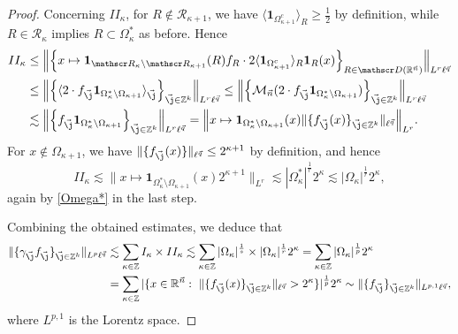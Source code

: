 \documentclass[10pt,a4paper]{amsart}
\newcommand{\Avee}[2]{\langle#1\rangle_{#2}}
\newcommand{\BNorm}[2]{\Big\|#1\Big\|_{#2}}
\newcommand{\Norm}[2]{\|#1\|_{#2}}
\newcommand{\Rs}{\mathscr R}
\newcommand{\R}{\mathbb R}
\newcommand{\Z}{\mathbb Z}
\newcommand{\abs}[1]{|#1|}
\newcommand{\ave}[1]{\langle #1\rangle}
\newcommand{\one}{\mathbf{1}}
\newcommand{\vj}{\vec{\textit{\j}}}
\newcommand{\vn}{\vec n}
\newcommand{\vq}{\vec q}
\begin{document}
\begin{proof}
Concerning $II_\kappa$, for $R\notin\Rs_{\kappa+1}$,
we have $\ave{\one_{\Omega_{\kappa+1}^c}}_R\geq\frac12$ by definition,
while $R\in\Rs_{\kappa}$ implies $R\subset\Omega_{\kappa}^*$ as before. Hence
\begin{align*}
II_\kappa
&\leq\BNorm{\Big\{x\mapsto \one_{\Rs_\kappa\setminus\Rs_{\kappa+1}}(R)f_{R}\cdot 2\ave{\one_{\Omega_{\kappa+1}^c}}_R\one_R(x)\Big\}_{R\in\mathscr D(\mathbb R^{\vn})}}{L^r\ell^{\vq}}  \\
&\leq \BNorm{\Big\{\Avee{2\cdot f_{\vj}\one_{\Omega_\kappa^*\setminus\Omega_{\kappa+1}}}{\vj}\Big\}_{\vj\in\mathbb Z^k}}{L^r\ell^{\vq}}
\leq \BNorm{\Big\{\mathcal M_{\vn}(2\cdot f_{\vj}\one_{\Omega_\kappa^*\setminus\Omega_{\kappa+1}}) \Big\}_{\vj\in\mathbb Z^k}}{L^r\ell^{\vq}} \\
&\lesssim\BNorm{\Big\{ f_{\vj}\one_{\Omega_\kappa^*\setminus\Omega_{\kappa+1}} \Big\}_{\vj\in\mathbb Z^k}}{L^r\ell^{\vq}}
=\BNorm{x\mapsto \one_{\Omega_\kappa^*\setminus\Omega_{\kappa+1}}(x) \Norm{\{ f_{\vj}(x) \}_{\vj\in\mathbb Z^k} }{\ell^{\vq} } }{L^r}.
\end{align*}
For $x\notin\Omega_{\kappa+1}$, we have $ \Norm{\{ f_{\vj}(x) \} }{\ell^{\vq} }\leq 2^{\kappa+1}$ by definition, and hence
\begin{equation*}
II_{\kappa}
\lesssim \BNorm{x\mapsto \one_{\Omega_\kappa^*\setminus\Omega_{\kappa+1}}(x)  2^{\kappa+1} }{L^r}
\lesssim \abs{\Omega_\kappa^*}^{\frac 1r}2^\kappa
\lesssim \abs{\Omega_\kappa}^{\frac 1r}2^\kappa,
\end{equation*}
again by \eqref{Omega*} in the last step.

Combining the obtained estimates, we deduce that
\begin{equation}\label{carl 12}
\begin{split}
  \Norm{\{\gamma_{\vj}f_{\vj}\}_{\vj\in\mathbb Z^k}}{L^p\ell^{\vq}}
  &\lesssim\sum_{\kappa\in\Z}I_\kappa\times II_\kappa
  \lesssim\sum_{\kappa\in\Z}\abs{\Omega_\kappa}^{\frac 1s}\times\abs{\Omega_\kappa}^{\frac 1r} 2^\kappa
  =\sum_{\kappa\in\Z}\abs{\Omega_\kappa}^{\frac 1p} 2^\kappa \\
  &=\sum_{\kappa\in\Z}\abs{\{x\in\R^{\vn}:\
  \Norm{\{f_{\vj}(x)\}_{\vj\in\mathbb Z^k}}{\ell^{\vq}}>2^\kappa\}}^{\frac 1p} 2^\kappa
  \sim\Norm{\{f_{\vj}\}_{\vj\in\mathbb Z^k}}{L^{p,1}\ell^{\vq}},
\end{split}
\end{equation}
where $L^{p,1}$ is the Lorentz space.


\end{proof}
\end{document}
